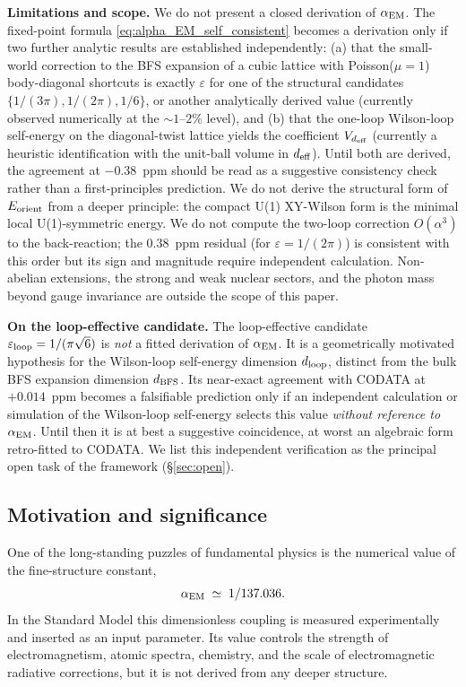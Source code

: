 \documentclass[11pt,a4paper]{article}
\begin{document}
\textbf{Limitations and scope.}
We do not present a closed derivation of $\alpha_{\rm EM}$. The
fixed-point formula \eqref{eq:alpha_EM_self_consistent} becomes
a derivation only if two further analytic results are
established independently: (a) that the small-world correction
to the BFS expansion of a cubic lattice with Poisson($\mu = 1$)
body-diagonal shortcuts is exactly $\varepsilon$ for one of the structural candidates $\{1/(3\pi), 1/(2\pi), 1/6\}$, or another analytically derived value (currently
observed numerically at the $\sim 1\text{--}2\%$ level), and (b) that
the one-loop Wilson-loop self-energy on the diagonal-twist
lattice yields the coefficient $V_{d_{\rm eff}}$ (currently a
heuristic identification with the unit-ball volume in
$d_{\rm eff}$). Until both are derived, the agreement at
$-0.38$~ppm should be read as a suggestive consistency check
rather than a first-principles prediction. We do not derive the
structural form of $E_{\rm orient}$ from a deeper principle:
the compact U(1) XY-Wilson form is the minimal local
U(1)-symmetric energy. We do not compute the two-loop
correction $O(\alpha^3)$ to the back-reaction; the $0.38$~ppm residual (for $\varepsilon = 1/(2\pi)$) is consistent with this order but its sign and
magnitude require independent calculation. Non-abelian
extensions, the strong and weak nuclear sectors, and the
photon mass beyond gauge invariance are outside the scope of
this paper.

\textbf{On the loop-effective candidate.}
The loop-effective candidate $\varepsilon_{\rm loop} = 1/(\pi\sqrt{6})$
is \emph{not} a fitted derivation of $\alpha_{\rm EM}$. It is a
geometrically motivated hypothesis for the Wilson-loop
self-energy dimension $d_{\rm loop}$, distinct from the bulk BFS
expansion dimension $d_{\rm BFS}$. Its near-exact agreement with
CODATA at $+0.014$~ppm becomes a falsifiable prediction only if
an independent calculation or simulation of the Wilson-loop
self-energy selects this value \emph{without reference to
$\alpha_{\rm EM}$}. Until then it is at best a suggestive
coincidence, at worst an algebraic form retro-fitted to CODATA.
We list this independent verification as the principal open
task of the framework (\S\ref{sec:open}).

\subsection*{Motivation and significance}

One of the long-standing puzzles of fundamental physics is the
numerical value of the fine-structure constant,
\begin{equation*}
\alpha_{\rm EM} \;\simeq\; 1/137.036.
\end{equation*}
In the Standard Model this dimensionless coupling is measured
experimentally and inserted as an input parameter. Its value
controls the strength of electromagnetism, atomic spectra,
chemistry, and the scale of electromagnetic radiative
corrections, but it is not derived from any deeper structure.
\end{document}

